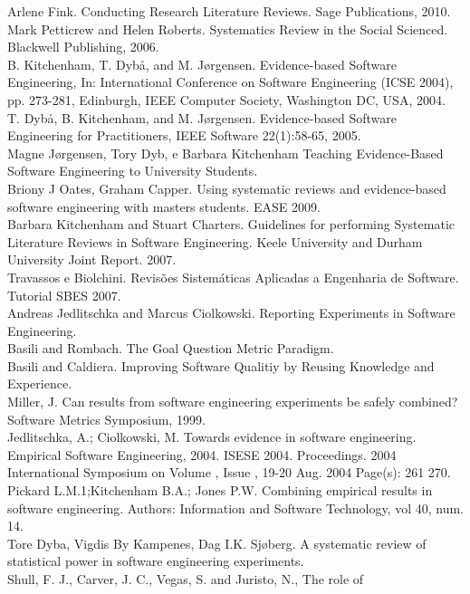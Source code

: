 \documentclass[
	12pt,				%
	openright,			%
  oneside,     %
	a4paper,			%
	english,			%
	french,				%
	spanish,			%
	brazil				%
	]{abntex2}
\begin{document}
\begin{apendicesenv}
Arlene Fink. Conducting Research Literature Reviews. Sage Publications,
2010.\\Mark Petticrew and Helen Roberts. Systematics Review in the Social
Scienced. Blackwell Publishing, 2006.\\
B. Kitchenham, T. Dybå, and M. Jørgensen. Evidence-based Software
Engineering, In: International Conference on Software Engineering
(ICSE 2004), pp. 273-281, Edinburgh, IEEE Computer
Society, Washington DC, USA, 2004. \\
T. Dybå, B. Kitchenham, and M. Jørgensen. Evidence-based Software
Engineering for Practitioners, IEEE Software 22(1):58-65, 2005.\\
Magne Jørgensen, Tory Dyb, e Barbara Kitchenham Teaching Evidence-Based
Software Engineering to University Students.\\
Briony J Oates, Graham Capper. Using systematic reviews and
evidence-based software engineering with masters students. EASE 2009.\\
Barbara Kitchenham and Stuart Charters. Guidelines for performing
Systematic Literature Reviews in Software Engineering. Keele University
and Durham University Joint Report. 2007.\\
Travassos e Biolchini. Revisões Sistemáticas Aplicadas a Engenharia de
Software. Tutorial SBES 2007.\\
Andreas Jedlitschka and Marcus Ciolkowski. Reporting Experiments in
Software Engineering.\\
Basili and Rombach. The Goal Question Metric Paradigm.\\
Basili and Caldiera. Improving Software Qualitiy by Reusing Knowledge
and Experience.\\
Miller, J. Can results from software engineering experiments be safely
combined? Software Metrics Symposium, 1999. \\
Jedlitschka, A.; Ciolkowski, M. Towards evidence in software
engineering. Empirical Software Engineering, 2004.
ISESE 2004. Proceedings. 2004 International Symposium on
Volume , Issue , 19-20 Aug. 2004 Page(s): 261  270.\\
Pickard L.M.1;Kitchenham B.A.; Jones P.W. Combining empirical results in
software engineering. Authors: Information and Software Technology, vol
40, num. 14.\\
Tore Dyba, Vigdis By Kampenes, Dag I.K. Sjøberg. A systematic review of
statistical power in software engineering experiments.\\
Shull, F. J., Carver, J. C., Vegas, S. and Juristo, N., The role of

\end{apendicesenv}
\end{document}
